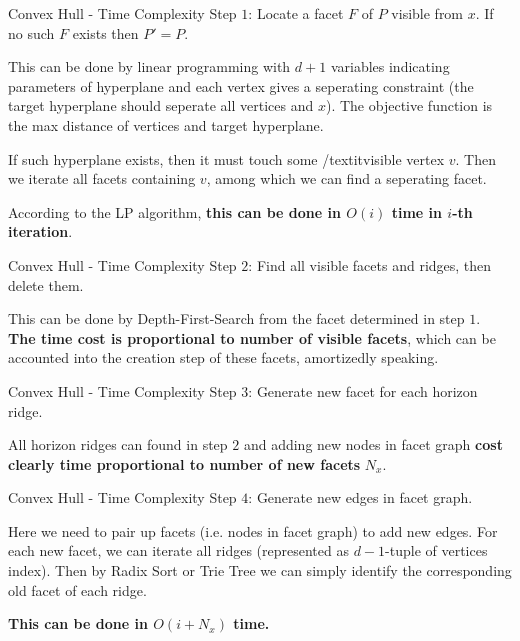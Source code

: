 \documentclass{beamer}
\begin{document}
\begin{frame}{Convex Hull - Time Complexity}
	Step $1$: Locate a facet $F$ of $P$ visible from $x$. If no such $F$ exists then $P' = P$.

	\vspace{\baselineskip}

	This can be done by linear programming with $d + 1$ variables indicating parameters of hyperplane and
	each vertex gives a seperating constraint (the target hyperplane should seperate all vertices and $x$).
	The objective function is the max distance of vertices and target hyperplane.

	\vspace{\baselineskip}

	If such hyperplane exists, then it must touch some /textit{visible} vertex $v$.
	Then we iterate all facets containing $v$, among which we can find a seperating facet.

	\vspace{\baselineskip}

	According to the LP algorithm, \textbf{this can be done in $O(i)$ time in $i$-th iteration}.
\end{frame}
\begin{frame}{Convex Hull - Time Complexity}
	Step $2$: Find all visible facets and ridges, then delete them.

	\vspace{\baselineskip}

	This can be done by Depth-First-Search from the facet determined in step $1$.
	\textbf{The time cost is proportional to number of visible facets}, which can be accounted
	into the creation step of these facets, amortizedly speaking.
\end{frame}
\begin{frame}{Convex Hull - Time Complexity}
	Step $3$: Generate new facet for each horizon ridge.

	\vspace{\baselineskip}

	All horizon ridges can found in step $2$ and adding new nodes in facet graph
	\textbf{cost clearly time proportional to number of new facets} $N_x$.
\end{frame}
\begin{frame}{Convex Hull - Time Complexity}
	Step $4$: Generate new edges in facet graph.

	\vspace{\baselineskip}

	Here we need to pair up facets (i.e. nodes in facet graph) to add new edges.
	For each new facet, we can iterate all ridges (represented as $d-1$-tuple of vertices index).
	Then by Radix Sort or Trie Tree we can simply identify the corresponding old facet of each ridge.

	\vspace{\baselineskip}

	\textbf{This can be done in $O(i + N_x)$ time.}
\end{frame}
\end{document}
